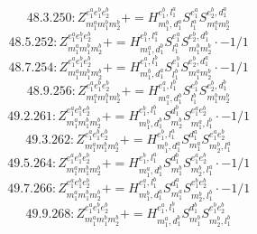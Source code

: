 \documentclass[letterpaper,10pt,fleqn,leqno,onecolumn]{article}
\begin{document}
\begin{equation} \;\;\;\;\;\;  48.3.250: Z^{e_{1}^{a}e_{1}^{b}e_{2}^{b}}_{m_{1}^{a}m_{1}^{b}m_{2}^{b}}+=H^{e_{1}^{b},l_{1}^{a}}_{m_{1}^{b},d_{1}^{a}}S^{e_{1}^{a}}_{l_{1}^{a}}S^{e_{2}^{b},d_{1}^{a}}_{m_{1}^{a}m_{2}^{b}} \end{equation}
\begin{equation} \;\;\;\;\;\;  48.5.252: Z^{e_{1}^{a}e_{1}^{b}e_{2}^{b}}_{m_{1}^{a}m_{1}^{b}m_{2}^{b}}+=H^{e_{1}^{b},l_{1}^{a}}_{m_{1}^{a},d_{1}^{b}}S^{e_{1}^{a}}_{l_{1}^{a}}S^{e_{2}^{b},d_{1}^{b}}_{m_{1}^{b}m_{2}^{b}}\cdot -1/1 \end{equation}
\begin{equation} \;\;\;\;\;\;  48.7.254: Z^{e_{1}^{a}e_{1}^{b}e_{2}^{b}}_{m_{1}^{a}m_{1}^{b}m_{2}^{b}}+=H^{e_{1}^{a},l_{1}^{b}}_{m_{1}^{b},d_{1}^{a}}S^{e_{1}^{b}}_{l_{1}^{b}}S^{e_{2}^{b},d_{1}^{a}}_{m_{1}^{a}m_{2}^{b}}\cdot -1/1 \end{equation}
\begin{equation} \;\;\;\;\;\;  48.9.256: Z^{e_{1}^{a}e_{1}^{b}e_{2}^{b}}_{m_{1}^{a}m_{1}^{b}m_{2}^{b}}+=H^{e_{1}^{a},l_{1}^{b}}_{m_{1}^{a},d_{1}^{b}}S^{e_{1}^{b}}_{l_{1}^{b}}S^{e_{2}^{b},d_{1}^{b}}_{m_{1}^{b}m_{2}^{b}} \end{equation}
\begin{equation} \;\;\;\;\;\;  49.2.261: Z^{e_{1}^{a}e_{1}^{b}e_{2}^{b}}_{m_{1}^{a}m_{1}^{b}m_{2}^{b}}+=H^{e_{1}^{b},l_{1}^{b}}_{m_{1}^{b},d_{1}^{b}}S^{d_{1}^{b}}_{m_{2}^{b}}S^{e_{1}^{a}e_{2}^{b}}_{m_{1}^{a},l_{1}^{b}}\cdot -1/1 \end{equation}
\begin{equation} \;\;\;\;\;\;  49.3.262: Z^{e_{1}^{a}e_{1}^{b}e_{2}^{b}}_{m_{1}^{a}m_{1}^{b}m_{2}^{b}}+=H^{e_{1}^{b},l_{1}^{a}}_{m_{1}^{b},d_{1}^{a}}S^{d_{1}^{a}}_{m_{1}^{a}}S^{e_{1}^{a}e_{2}^{b}}_{m_{2}^{b},l_{1}^{a}} \end{equation}
\begin{equation} \;\;\;\;\;\;  49.5.264: Z^{e_{1}^{a}e_{1}^{b}e_{2}^{b}}_{m_{1}^{a}m_{1}^{b}m_{2}^{b}}+=H^{e_{1}^{b},l_{1}^{a}}_{m_{1}^{a},d_{1}^{b}}S^{d_{1}^{b}}_{m_{1}^{b}}S^{e_{1}^{a}e_{2}^{b}}_{m_{2}^{b},l_{1}^{a}}\cdot -1/1 \end{equation}
\begin{equation} \;\;\;\;\;\;  49.7.266: Z^{e_{1}^{a}e_{1}^{b}e_{2}^{b}}_{m_{1}^{a}m_{1}^{b}m_{2}^{b}}+=H^{e_{1}^{a},l_{1}^{b}}_{m_{1}^{b},d_{1}^{a}}S^{d_{1}^{a}}_{m_{1}^{a}}S^{e_{1}^{b}e_{2}^{b}}_{m_{2}^{b},l_{1}^{b}}\cdot -1/1 \end{equation}
\begin{equation} \;\;\;\;\;\;  49.9.268: Z^{e_{1}^{a}e_{1}^{b}e_{2}^{b}}_{m_{1}^{a}m_{1}^{b}m_{2}^{b}}+=H^{e_{1}^{a},l_{1}^{b}}_{m_{1}^{a},d_{1}^{b}}S^{d_{1}^{b}}_{m_{1}^{b}}S^{e_{1}^{b}e_{2}^{b}}_{m_{2}^{b},l_{1}^{b}} \end{equation}
\end{document}
